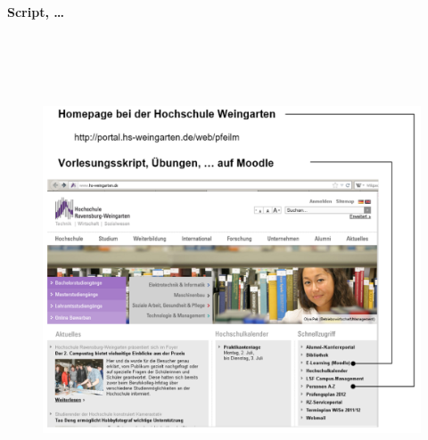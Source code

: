 {\huge \textbf{Script, …} }\vspace{0.5cm}

\begin{figure}[h]
\centering
\includegraphics[width=16cm, height=14cm]{Images/image191.png}
\label{fig:Fig }
\end{figure}
\newpage